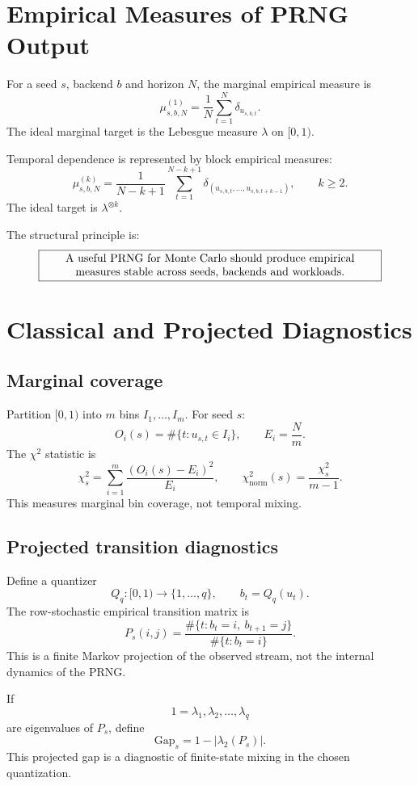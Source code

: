 \documentclass[11pt,a4paper]{article}
\begin{document}
\section{Empirical Measures of PRNG Output}

For a seed $s$, backend $b$ and horizon $N$, the marginal empirical measure is
\[
\mu^{(1)}_{s,b,N}
=
\frac1N\sum_{t=1}^{N}\delta_{u_{s,b,t}}.
\]
The ideal marginal target is the Lebesgue measure $\lambda$ on $[0,1)$.

Temporal dependence is represented by block empirical measures:
\[
\mu^{(k)}_{s,b,N}
=
\frac1{N-k+1}
\sum_{t=1}^{N-k+1}
\delta_{(u_{s,b,t},\ldots,u_{s,b,t+k-1})},
\qquad k\geq2.
\]
The ideal target is $\lambda^{\otimes k}$.

The structural principle is:
\[
\boxed{
\parbox{0.86\textwidth}{\centering
A useful PRNG for Monte Carlo should produce empirical measures stable across seeds, backends and workloads.}
}
\]

\section{Classical and Projected Diagnostics}

\subsection{Marginal coverage}

Partition $[0,1)$ into $m$ bins $I_1,\ldots,I_m$. For seed $s$:
\[
O_i(s)=\#\{t:u_{s,t}\in I_i\},
\qquad
E_i=\frac Nm.
\]
The $\chi^2$ statistic is
\[
\chi^2_s=\sum_{i=1}^{m}\frac{(O_i(s)-E_i)^2}{E_i},
\qquad
\chi^2_{\mathrm{norm}}(s)=\frac{\chi^2_s}{m-1}.
\]
This measures marginal bin coverage, not temporal mixing.

\subsection{Projected transition diagnostics}

Define a quantizer
\[
Q_q:[0,1)\to\{1,\ldots,q\},
\qquad
b_t=Q_q(u_t).
\]
The row-stochastic empirical transition matrix is
\[
P_s(i,j)=
\frac{\#\{t:b_t=i,\ b_{t+1}=j\}}
{\#\{t:b_t=i\}}.
\]
This is a finite Markov projection of the observed stream, not the internal dynamics of the PRNG.

If
\[
1=\lambda_1,\lambda_2,\ldots,\lambda_q
\]
are eigenvalues of $P_s$, define
\[
\mathrm{Gap}_s=1-|\lambda_2(P_s)|.
\]
This projected gap is a diagnostic of finite-state mixing in the chosen quantization.
\end{document}
